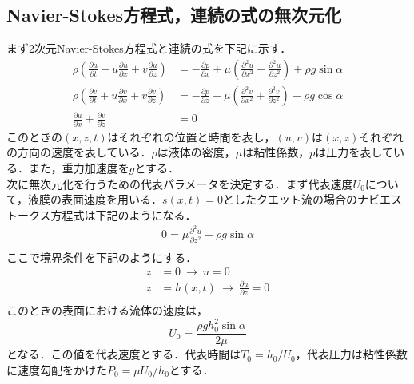 \documentclass[autodetect-engine,dvipdfmx-if-dvi,ja=standard,a4paper,11pt]{bxjsarticle} %
\begin{document}
\subsection{Navier-Stokes方程式，連続の式の無次元化}
まず2次元Navier-Stokes方程式と連続の式を下記に示す．
\begin{subequations}
\begin{align}
\rho \left(\frac{\partial u}{\partial t}+u\frac{\partial u}{\partial x}+v\frac{\partial u}{\partial z}\right)&=-\frac{\partial p}{\partial x}+\mu \left(\frac{\partial ^2u}{\partial x^2}+\frac{\partial^2 u}{\partial z^2}\right)+\rho g\sin\alpha\label{eq:ns1}\\
\rho \left(\frac{\partial v}{\partial t}+u\frac{\partial v}{\partial x}+v\frac{\partial v}{\partial z}\right)&=-\frac{\partial p}{\partial z}+\mu \left(\frac{\partial ^2v}{\partial x^2}+\frac{\partial ^2v}{\partial z^2}\right)-\rho g\cos\alpha\label{eq:ns2}\\
\frac{\partial u}{\partial x}+\frac{\partial v}{\partial z}&=0\label{eq:mass}
\end{align}
\label{eq:ns}
\end{subequations}
このときの$(x,z,t)$はそれぞれの位置と時間を表し，$(u,v)$は$(x,z)$それぞれの方向の速度を表している．$\rho$は液体の密度，$\mu$は粘性係数，$p$は圧力を表している．また，重力加速度を$g$とする．\\
\　次に無次元化を行うための代表パラメータを決定する．まず代表速度$U_0$について，液膜の表面速度を用いる．$s(x,t)=0$としたクエット流の場合のナビエストークス方程式は下記のようになる．
\begin{equation}
\begin{split}
0=\mu\frac{\partial^2 u}{\partial z^2}+\rho g\sin\alpha\\
\end{split}
\end{equation}
ここで境界条件を下記のようにする．
\begin{equation}
\begin{split}
z&=0\ \rightarrow\ u=0\\
z&=h(x,t)\ \rightarrow\ 
\frac{\partial u}{\partial z}=0\\
\end{split}
\end{equation}
このときの表面における流体の速度は，
\begin{equation}
U_0=\frac{\rho gh_0^2\sin\alpha}{2\mu}
\end{equation}
となる．この値を代表速度とする．代表時間は$T_0=h_0/U_0$，代表圧力は粘性係数に速度勾配をかけた$P_0=\mu U_0/h_0$とする．\\
\end{document}
